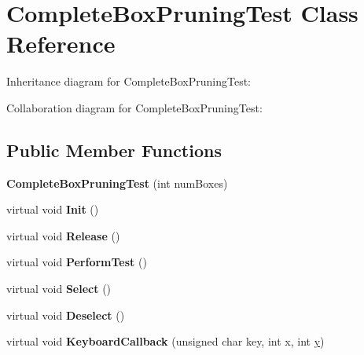 \hypertarget{class_complete_box_pruning_test}{\section{Complete\+Box\+Pruning\+Test Class Reference}
\label{class_complete_box_pruning_test}
}


Inheritance diagram for Complete\+Box\+Pruning\+Test\+:


Collaboration diagram for Complete\+Box\+Pruning\+Test\+:
\subsection*{Public Member Functions}
\begin{DoxyCompactItemize}
\item 
\hypertarget{class_complete_box_pruning_test_aae530c094b2abbd2432f4398830b9d2a}{{\bfseries Complete\+Box\+Pruning\+Test} (int num\+Boxes)}\label{class_complete_box_pruning_test_aae530c094b2abbd2432f4398830b9d2a}

\item 
\hypertarget{class_complete_box_pruning_test_a9c9cab7ff5b4e0fdb3810a5aec892f49}{virtual void {\bfseries Init} ()}\label{class_complete_box_pruning_test_a9c9cab7ff5b4e0fdb3810a5aec892f49}

\item 
\hypertarget{class_complete_box_pruning_test_a54f1ac089d90767b4dd17a281054c533}{virtual void {\bfseries Release} ()}\label{class_complete_box_pruning_test_a54f1ac089d90767b4dd17a281054c533}

\item 
\hypertarget{class_complete_box_pruning_test_a70c789686ac13dd05e60ddb052fecf7a}{virtual void {\bfseries Perform\+Test} ()}\label{class_complete_box_pruning_test_a70c789686ac13dd05e60ddb052fecf7a}

\item 
\hypertarget{class_complete_box_pruning_test_ac47bbc317f2a339e0930e61de1c00fec}{virtual void {\bfseries Select} ()}\label{class_complete_box_pruning_test_ac47bbc317f2a339e0930e61de1c00fec}

\item 
\hypertarget{class_complete_box_pruning_test_a7286e318de268a12a5cff66ae0307418}{virtual void {\bfseries Deselect} ()}\label{class_complete_box_pruning_test_a7286e318de268a12a5cff66ae0307418}

\item 
\hypertarget{class_complete_box_pruning_test_a43ca490378754ed5f73c95aa10fcc5f2}{virtual void {\bfseries Keyboard\+Callback} (unsigned char key, int x, int \hyperlink{_ice_utils_8h_aa7ffaed69623192258fb8679569ff9ba}{y})}\label{class_complete_box_pruning_test_a43ca490378754ed5f73c95aa10fcc5f2}


\end{DoxyCompactItemize}
